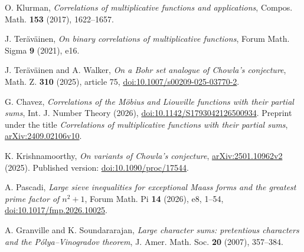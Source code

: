 O. Klurman, \emph{Correlations of multiplicative functions and
applications}, Compos. Math. \textbf{153} (2017), 1622--1657.

J. Ter\"av\"ainen, \emph{On binary correlations of multiplicative
functions}, Forum Math. Sigma \textbf{9} (2021), e16.

J. Ter\"av\"ainen and A. Walker, \emph{On a Bohr set analogue of
Chowla's conjecture}, Math. Z. \textbf{310} (2025), article 75,
\href{https://doi.org/10.1007/s00209-025-03770-2}
 {doi:10.1007/s00209-025-03770-2}.

G. Chavez, \emph{Correlations of the M\"obius and Liouville functions
with their partial sums}, Int. J. Number Theory (2026),
\href{https://doi.org/10.1142/S1793042126500934}
 {doi:10.1142/S1793042126500934}.
Preprint under the title \emph{Correlations of multiplicative functions
with their partial sums},
\href{https://arxiv.org/abs/2409.02106v10}{arXiv:2409.02106v10}.

K. Krishnamoorthy, \emph{On variants of Chowla's conjecture},
\href{https://arxiv.org/abs/2501.10962v2}{arXiv:2501.10962v2} (2025).
Published version:
\href{https://doi.org/10.1090/proc/17544}{doi:10.1090/proc/17544}.

A. Pascadi, \emph{Large sieve inequalities for exceptional Maass forms
and the greatest prime factor of \(n^2+1\)},
Forum Math. Pi \textbf{14} (2026), e8, 1--54,
\href{https://doi.org/10.1017/fmp.2026.10025}
 {doi:10.1017/fmp.2026.10025}.

A. Granville and K. Soundararajan, \emph{Large character sums:
pretentious characters and the P\'olya--Vinogradov theorem},
J. Amer. Math. Soc. \textbf{20} (2007), 357--384.
